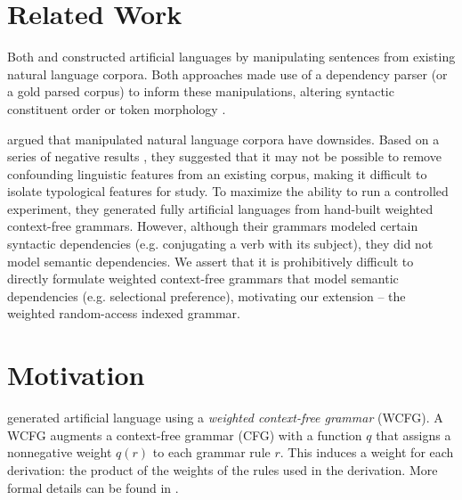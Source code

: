 \documentclass[11pt]{article}
\begin{document}
\section{Related Work}


Both \citet{wang-eisner-2016-galactic} and \citet{ravfogel-etal-2019-studying} constructed artificial languages by manipulating sentences from existing natural language corpora. Both approaches made use of a dependency parser (or a gold parsed corpus) to inform these manipulations, altering syntactic constituent order \cite{wang-eisner-2016-galactic,ravfogel-etal-2019-studying} or token morphology \cite{ravfogel-etal-2019-studying}. 

\citet{white-cotterell-2021-examining} argued that manipulated natural language corpora have downsides. Based on a series of negative results \cite{cotterell-etal-2018-languages,mielke-etal-2019-kind}, they suggested that it may not be possible to remove confounding linguistic features from an existing corpus, making it difficult to isolate typological features for study. To maximize the ability to run a controlled experiment, they generated fully artificial languages from hand-built weighted context-free grammars. However, although their grammars modeled certain syntactic dependencies (e.g. conjugating a verb with its subject), they did not model semantic dependencies. We assert that it is prohibitively difficult to directly formulate weighted context-free grammars that model semantic dependencies (e.g. selectional preference), motivating our extension -- the weighted random-access indexed grammar. 





\section{Motivation}



\citet{white-cotterell-2021-examining} generated artificial language using a \emph{weighted context-free grammar} (WCFG). A WCFG augments a context-free grammar (CFG) with a function $q$ that assigns a nonnegative weight $q(r)$ to each grammar rule $r$. This induces a weight for each derivation: the product of the weights of the rules used in the derivation. More formal details can be found in \citet{collins2013lexicalized}. 
\end{document}
